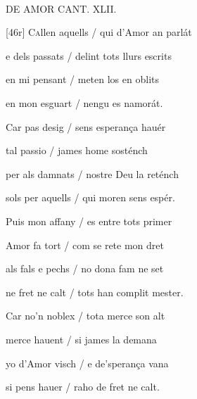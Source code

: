 \documentclass[12pt]{article}
\renewcommand{\espaiAbansEtiquetaPoema}{\vspace{0ex}}
\begin{document}
\begin{estrofa}

\espaiAbansEtiquetaPoema

\\

\begin{rubrica}

DE AMOR CANT. XLII.

\end{rubrica}

\end{estrofa}


\begin{estrofa}

 [46r] C\textsc{a}llen aquells / qui d'Amor an parl\'{a}t

 e dels passats / delint tots llurs escrits

 en mi pensant / meten los en oblits

 en mon esguart / nengu es namor\'{a}t.

 Car pas desig / sens esperan\c{c}a hau\'{e}r

 tal passio / james home sost\'{e}nch

 per als damnats / nostre Deu la ret\'{e}nch

 sols per aquells / qui moren sens esp\'{e}r.

\end{estrofa}



\begin{estrofa}

 Puis mon affany / es entre tots primer

 Amor fa tort / com se rete mon dret

 als fals e pechs / no dona fam ne set

 ne fret ne calt / tots han complit mester.

 Car no'n noblex / tota merce son alt

 merce hauent / si james la demana

 yo d'Amor visch / e de'speran\c{c}a vana

 si pens hauer / raho de fret ne calt.

\end{estrofa}
\end{document}
